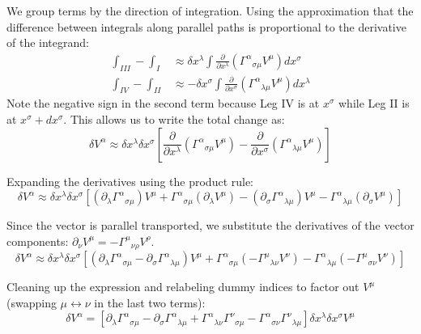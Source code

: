 \documentclass[11pt, a4paper]{report}
\begin{document}
We group terms by the direction of integration. Using the approximation that the difference between integrals along parallel paths is proportional to the derivative of the integrand:
\begin{align}
    \int_{III} - \int_{I} &\approx \delta x^{\lambda} \int \frac{\partial}{\partial x^{\lambda}} ({\Gamma^{\alpha}}_{\sigma\mu} V^{\mu}) dx^{\sigma} \\
    \int_{IV} - \int_{II} &\approx -\delta x^{\sigma} \int \frac{\partial}{\partial x^{\sigma}} ({\Gamma^{\alpha}}_{\lambda\mu} V^{\mu}) dx^{\lambda}
\end{align}
Note the negative sign in the second term because Leg IV is at $x^{\sigma}$ while Leg II is at $x^{\sigma} + dx^{\sigma}$. This allows us to write the total change as:
\begin{equation}
    \delta V^{\alpha} \approx \delta x^{\lambda} \delta x^{\sigma} \left[ \frac{\partial}{\partial x^{\lambda}} ({\Gamma^{\alpha}}_{\sigma\mu} V^{\mu}) - \frac{\partial}{\partial x^{\sigma}} ({\Gamma^{\alpha}}_{\lambda\mu} V^{\mu}) \right]
\end{equation}

Expanding the derivatives using the product rule:
\begin{equation}
    \delta V^{\alpha} \approx \delta x^{\lambda} \delta x^{\sigma} \left[ (\partial_{\lambda} {\Gamma^{\alpha}}_{\sigma\mu}) V^{\mu} + {\Gamma^{\alpha}}_{\sigma\mu} (\partial_{\lambda} V^{\mu}) - (\partial_{\sigma} {\Gamma^{\alpha}}_{\lambda\mu}) V^{\mu} - {\Gamma^{\alpha}}_{\lambda\mu} (\partial_{\sigma} V^{\mu}) \right]
\end{equation}

Since the vector is parallel transported, we substitute the derivatives of the vector components: $\partial_{\nu} V^{\mu} = -{\Gamma^{\mu}}_{\nu\rho} V^{\rho}$.
\begin{equation}
    \delta V^{\alpha} \approx \delta x^{\lambda} \delta x^{\sigma} \left[ (\partial_{\lambda} {\Gamma^{\alpha}}_{\sigma\mu} - \partial_{\sigma} {\Gamma^{\alpha}}_{\lambda\mu}) V^{\mu} + {\Gamma^{\alpha}}_{\sigma\mu} (-{\Gamma^{\mu}}_{\lambda\nu} V^{\nu}) - {\Gamma^{\alpha}}_{\lambda\mu} (-{\Gamma^{\mu}}_{\sigma\nu} V^{\nu}) \right]
\end{equation}

Cleaning up the expression and relabeling dummy indices to factor out $V^{\mu}$ (swapping $\mu \leftrightarrow \nu$ in the last two terms):
\begin{equation}
    \delta V^{\alpha} = \left[ \partial_{\lambda} {\Gamma^{\alpha}}_{\sigma\mu} - \partial_{\sigma} {\Gamma^{\alpha}}_{\lambda\mu} + {\Gamma^{\alpha}}_{\lambda\nu} {\Gamma^{\nu}}_{\sigma\mu} - {\Gamma^{\alpha}}_{\sigma\nu} {\Gamma^{\nu}}_{\lambda\mu} \right] \delta x^{\lambda} \delta x^{\sigma} V^{\mu}
\end{equation}
\end{document}
